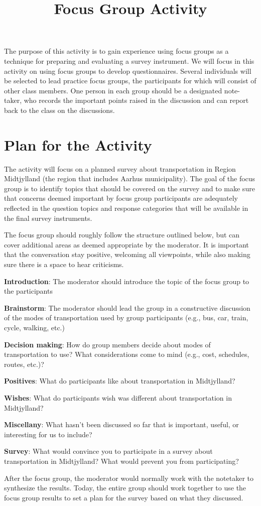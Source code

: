 \documentclass[12pt, a4]{article}
\title{Focus Group Activity\vspace{-2em}}
\author{}
\date{}
\begin{document}
\maketitle

\onehalfspacing

\noindent The purpose of this activity is to gain experience using focus groups as a technique for preparing and evaluating a survey instrument. We will focus in this activity on using focus groups to develop questionnaires. Several individuals will be selected to lead practice focus groups, the participants for which will consist of other class members. One person in each group should be a designated note-taker, who records the important points raised in the discussion and can report back to the class on the discussions.

\section*{Plan for the Activity}

The activity will focus on a planned survey about transportation in Region Midtjylland (the region that includes Aarhus municipality). The goal of the focus group is to identify topics that should be covered on the survey and to make sure that concerns deemed important by focus group participants are adequately reflected in the question topics and response categories that will be available in the final survey instruments.

The focus group should roughly follow the structure outlined below, but can cover additional areas as deemed appropriate by the moderator. It is important that the conversation stay positive, welcoming all viewpoints, while also making sure there is a space to hear criticisms.

\begin{enumerate*}
	\item \textbf{Introduction}: The moderator should introduce the topic of the focus group to the participants
	\item \textbf{Brainstorm}: The moderator should lead the group in a constructive discussion of the modes of transportation used by group participants (e.g., bus, car, train, cycle, walking, etc.)
	\item \textbf{Decision making}: How do group members decide about modes of transportation to use? What considerations come to mind (e.g., cost, schedules, routes, etc.)?
	\item \textbf{Positives}: What do participants like about transportation in Midtjylland?
	\item \textbf{Wishes}: What do participants wish was different about transportation in Midtjylland?
	\item \textbf{Miscellany}: What hasn't been discussed so far that is important, useful, or interesting for us to include?
	\item \textbf{Survey}: What would convince you to participate in a survey about transportation in Midtjylland? What would prevent you from participating?
\end{enumerate*}

\noindent After the focus group, the moderator would normally work with the notetaker to synthesize the results. Today, the entire group should work together to use the focus group results to set a plan for the survey based on what they discussed.
\end{document}
